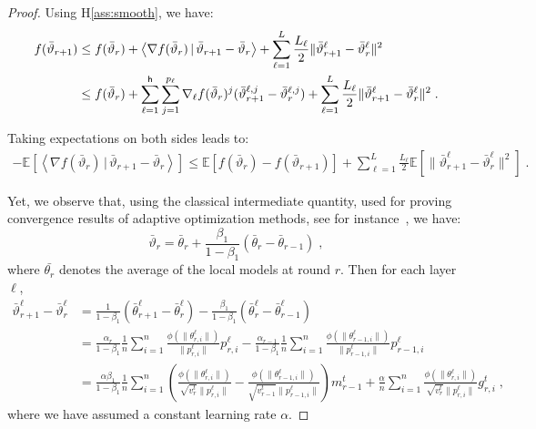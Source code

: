 \documentclass[11pt]{article}
\newcommand{\eqsp}{\;}
\newcommand{\beq}{\begin{equation}}
\newcommand{\eeq}{\end{equation}}
\def\EE{\mathbb{E}}
\newcommand{\pscal}[2]{\left\langle#1\,|\,#2 \right\rangle}
\def\tot{\mathsf{h}}
\begin{document}

\begin{proof}
Using H\ref{ass:smooth}, we have:
\begin{align}\notag
f(\bar{\vartheta}_{r+1}) &  \leq f(\bar{\vartheta}_r) + \pscal{\nabla f(\bar{\vartheta}_r)}{\bar{\vartheta}_{r+1} - \bar{\vartheta}_r} + \sum_{\ell =1}^L \frac{L_\ell}{2} \| \bar{\vartheta}^\ell_{r+1} - \bar{\vartheta}^\ell_r \|^2\\\notag
&  \leq f(\bar{\vartheta}_r) + \sum_{\ell=1}^\tot \sum_{j=1}^{p_\ell} \nabla_{\ell} f(\bar{\vartheta}_r)^j (\bar{\vartheta}^{\ell,j}_{r+1} - \bar{\vartheta}^{\ell,j}_r) + \sum_{\ell =1}^L \frac{L_\ell}{2} \| \bar{\vartheta}^\ell_{r+1} - \bar{\vartheta}^\ell_r \|^2  \eqsp.
\end{align}

Taking expectations on both sides leads to:
\begin{align}\label{eq:main}
- \EE[  \pscal{\nabla f(\bar{\vartheta}_r)}{\bar{\vartheta}_{r+1} - \bar{\vartheta}_r}]  \leq  \EE[ f(\bar{\vartheta}_r) - f(\bar{\vartheta}_{r+1})] + \sum_{\ell =1}^L \frac{L_\ell}{2} \EE[  \| \bar{\vartheta}^\ell_{r+1} - \bar{\vartheta}^\ell_r \|^2] \eqsp.
\end{align}

Yet, we observe that, using the classical intermediate quantity, used for proving convergence results of adaptive optimization methods, see for instance~\cite{RKK18}, we have:
\beq\label{eq:defseq}
\bar{\vartheta}_r = \bar{\theta}_r +  \frac{\beta_1}{1-\beta_1}(\bar{\theta}_{r} - \bar{\theta}_{r-1}) \eqsp,
\eeq
where $\bar{\theta_r}$ denotes the average of the local models at round $r$.
Then for each layer $\ell$,
\begin{align}\label{eq:gap}
\bar{\vartheta}^\ell_{r+1} - \bar{\vartheta}^\ell_r  & = \frac{1}{1-\beta_1}(\bar{\theta}^\ell_{r+1} - \bar{\theta}^\ell_{r}) - \frac{\beta_1}{1-\beta_1}(\bar{\theta}^\ell_{r} - \bar{\theta}^\ell_{r-1}) \nonumber\\
& = \frac{\alpha_{r}}{1-\beta_1} \frac{1}{n} \sum_{i = 1}^n \frac{\phi(\|\theta_{r,i}^{\ell}\|)}{\|p_{r,i}^{\ell}\|} p_{r,i}^{\ell}  - \frac{\alpha_{r-1}}{1-\beta_1} \frac{1}{n} \sum_{i = 1}^n \frac{\phi(\|\theta_{r-1,i}^{\ell}\|)}{\|p_{r-1,i}^{\ell}\|} p_{r-1,i}^{\ell}\nonumber\\
& = \frac{\alpha \beta_1}{1-\beta_1} \frac{1}{n}  \sum_{i = 1}^n  \left( \frac{\phi(\|\theta_{r,i}^{\ell}\|)}{\sqrt{v^{t}_{r}} \|p_{r,i}^{\ell}\|} - \frac{\phi(\|\theta_{r-1,i}^{\ell}\|)}{\sqrt{v^{t}_{r-1}} \|p_{r-1,i}^{\ell}\|} \right) m^{t}_{r-1} + \frac{\alpha}{n} \sum_{i = 1}^n \frac{\phi(\|\theta_{r,i}^{\ell}\|)}{\sqrt{v^{t}_{r}} \|p_{r,i}^{\ell}\|} g^t_{r,i} \eqsp,
\end{align}
where we have assumed a constant learning rate $\alpha$.



\end{proof}
\end{document}
